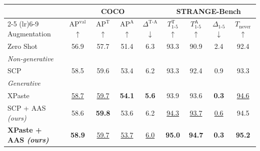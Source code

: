 \begin{tabular}{l cccc cccc}
\toprule
& \multicolumn{4}{c}{\textbf{COCO}} & \multicolumn{4}{c}{\textbf{STRANGE-Bench}} \\
\cmidrule(lr){2-5} \cmidrule(lr){6-9}
Augmentation & $\text{AP}^{\text{val}}$ $\uparrow$ & $\text{AP}^{\text{T}}$ $\uparrow$ & $\text{AP}^{\text{A}}$ $\uparrow$ & $\Delta^{\text{T-A}}$ $\downarrow$ & $T_{1\text{-}5}^{\text{T}}$ $\uparrow$ & $T_{1\text{-}5}^{\text{A}}$ $\uparrow$ & $\Delta_{1\text{-}5}$ $\downarrow$ & $T_{\text{never}}$ $\uparrow$ \\
\midrule
Zero Shot & 56.9 & 57.7 & 51.4 & 6.3 & 93.3 & 90.9 & 2.4 & 92.4 \\
\midrule
\multicolumn{9}{l}{\emph{Non-generative}} \\
SCP & 58.5 & 59.6 & 53.4 & 6.2 & 93.3 & 92.4 & 0.9 & 93.3 \\
\midrule
\multicolumn{9}{l}{\emph{Generative}} \\
XPaste & \underline{58.7} & \underline{59.7} & \textbf{54.1} & \textbf{5.6} & 93.9 & 93.6 & \textbf{0.3} & \underline{94.6} \\
\midrule
\rowcolor{oursrow} SCP + AAS \emph{(ours)} & 58.6 & \textbf{59.8} & 53.6 & 6.2 & \underline{94.3} & \underline{93.7} & \underline{0.6} & 94.5 \\
\rowcolor{oursrow} \textbf{XPaste + AAS \emph{(ours)}} & \textbf{58.9} & \underline{59.7} & \underline{53.7} & \underline{6.0} & \textbf{95.0} & \textbf{94.7} & \textbf{0.3} & \textbf{95.2} \\
\bottomrule
\end{tabular}
